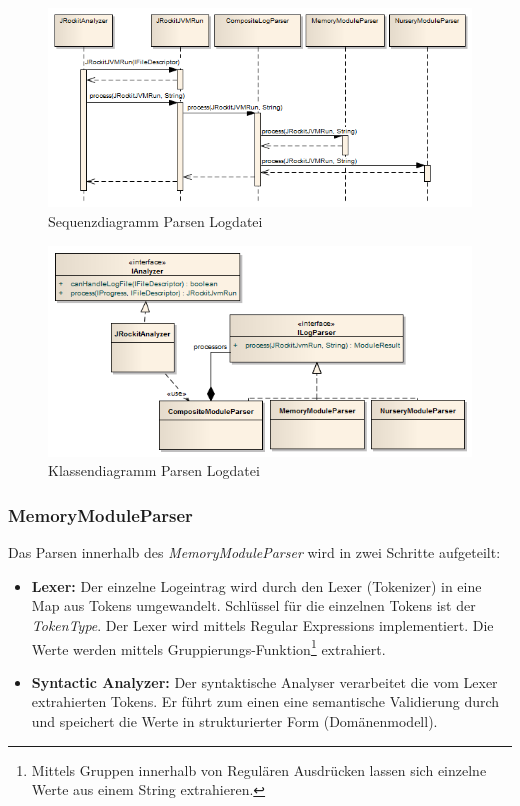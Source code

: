  \begin{figure}[H]
  	\centering
    	\includegraphics[width=16cm]{images/acitivity_parse_prozess}
        	\caption{Sequenzdiagramm Parsen Logdatei}
\end{figure}
 \begin{figure}[H]
  	\centering
    	\includegraphics[width=16cm]{images/jrockit_log_processing}
        	\caption{Klassendiagramm Parsen Logdatei}
\end{figure}

\subsubsection{MemoryModuleParser}
Das Parsen innerhalb des \textit{MemoryModuleParser} wird in zwei Schritte aufgeteilt:
\begin{itemize}
\item \textbf{Lexer: }Der einzelne Logeintrag wird durch den Lexer (Tokenizer) in eine Map aus Tokens umgewandelt. Schlüssel für die einzelnen Tokens ist der \textit{TokenType}. Der Lexer wird mittels Regular Expressions implementiert. Die Werte werden mittels Gruppierungs-Funktion\footnote{Mittels Gruppen innerhalb von Regulären Ausdrücken lassen sich einzelne Werte aus einem String extrahieren.} extrahiert. 
\item \textbf{Syntactic Analyzer: }Der syntaktische Analyser verarbeitet die vom Lexer extrahierten Tokens. Er führt zum einen eine semantische Validierung durch und speichert die Werte in strukturierter Form (Domänenmodell).
\end{itemize}

